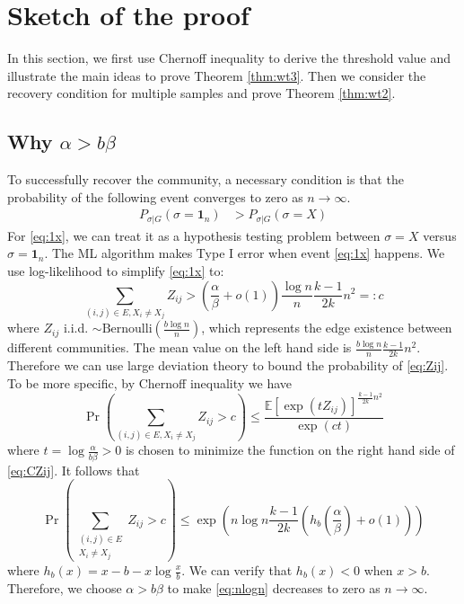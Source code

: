 \documentclass[conference]{IEEEtran}
\begin{document}
	\section{Sketch of the proof}
	\label{sect:sketch}
	
	In this section, we first use Chernoff inequality to derive the threshold value and illustrate the main ideas to prove Theorem \ref{thm:wt3}.
	Then we consider the recovery condition for multiple samples and prove Theorem \ref{thm:wt2}.
	
	\subsection{Why $\alpha > b \beta$}
	To successfully recover the community, a necessary condition is that the probability of the following event converges to zero as $n\to\infty$.
	\begin{align}
	P_{\sigma | G}(\sigma =  \mathbf{1}_n) & > P_{\sigma | G}(\sigma = X) \label{eq:1x}
	\end{align}
	For \eqref{eq:1x}, we can treat it as a hypothesis testing problem between $\sigma = X$ versus $\sigma = \mathbf{1}_n$.
	The ML algorithm makes Type I error when event \eqref{eq:1x} happens. We use log-likelihood to simplify
	\eqref{eq:1x} to:
	\begin{equation}\label{eq:Zij}
	\sum_{(i,j)\in E, X_i \neq X_j} Z_{ij} > (\frac{\alpha}{\beta} + o(1)) \frac{\log n}{n} \frac{k-1}{2k}n^2 =: c
	\end{equation}
	where $Z_{ij}$ i.i.d. $\sim \textrm{Bernoulli}(\frac{b\log n }{n})$, which represents the edge existence between different communities. The mean value on the left hand side is $\frac{b \log n }{n} \frac{k-1}{2k}n^2$. Therefore we can use large
	deviation theory to bound the probability of \eqref{eq:Zij}. To be more specific, by Chernoff inequality we have
	\begin{equation}\label{eq:CZij}
	\Pr\left(\sum_{(i,j)\in E, X_i \neq X_j} Z_{ij} >  c \right)\leq \frac{\mathbb{E}[\exp(t Z_{ij})]^{ \frac{k-1}{2k}n^2 }}{\exp(ct)}
	\end{equation}
	where $ t  = \log \frac{\alpha}{b\beta} > 0$ is chosen to minimize the function on the right hand side of \eqref{eq:CZij}. It follows that
	\begin{equation}\label{eq:nlogn}
	\Pr(\sum_{\substack{(i,j)\in E \\ X_i \neq X_j}} Z_{ij} >  c )\leq \exp(n\log n  \frac{k-1}{2k} (h_b(\frac{\alpha}{\beta}) + o(1)))
	\end{equation}
	where $h_b(x) = x - b - x \log\frac{x}{b}$. We can verify that $h_b(x) < 0 $ when $ x > b$.
	Therefore, we choose $\alpha > b \beta$	to make \eqref{eq:nlogn} decreases to zero as $n\to\infty$.
	
\end{document}

